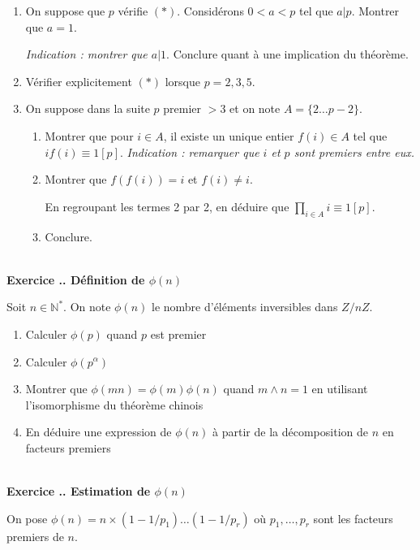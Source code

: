 \documentclass{article}
\newcommand{\mb}[1]{\mathbb{#1}}
\newcounter{exo}
\newcommand{\exercice}[1][\null]{\textbf{\\ Exercice \thesection.\theexo. #1} \addtocounter{exo}{1}}
\begin{document}
\begin{enumerate}

\item On suppose que $p$ vérifie $(*)$. Considérons $0 < a <p$ tel que $a | p$. Montrer que $a =1$. 

\emph{Indication : montrer que $a | 1$}. Conclure quant à une implication du théorème.

\item Vérifier explicitement $(*)$ lorsque $p = 2,3,5$.

\item On suppose dans la suite $p$ premier $> 3$ et on note $A = \{2 \dots p-2\}$.

\begin{enumerate}

\item Montrer que pour $i \in A$, il existe un unique entier $f(i) \in A$ tel que $if(i) \equiv 1 [p]$. \emph{Indication : remarquer que $i$ et $p$ sont premiers entre eux.}

\item Montrer que $f(f(i)) =i$ et $f(i) \neq i$.

En regroupant les termes 2 par 2, en déduire que $\prod_{i \in A} i \equiv 1 [p]$.

\item Conclure.

\end{enumerate}

\end{enumerate}


\exercice[Définition de $\phi(n)$]

Soit $n \in \mb{N}^*$. On note $\phi(n)$ le nombre 
d'éléments inversibles dans $Z/nZ$.

\begin{enumerate}
    \item Calculer $\phi(p)$ quand $p$ est premier 
    \item Calculer $\phi(p^\alpha)$ 
    \item Montrer que $\phi(mn) = \phi (m) \phi (n)$ quand 
        $m \wedge n = 1$
        en utilisant l'isomorphisme du théorème chinois 
    \item En déduire une expression de $\phi(n)$ à partir de la 
        décomposition de $n$ en facteurs premiers
\end{enumerate}

\exercice[Estimation de $\phi(n)$]

On pose $\phi(n) = n \times (1 - 1/p_1) \dots (1 - 1 / p_r)$
où $p_1, \dots, p_r$ sont les facteurs premiers de $n$.
\end{document}
